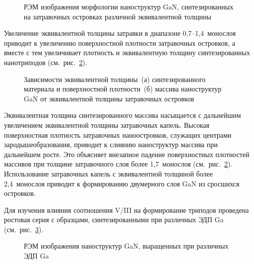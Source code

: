 \begin{figure}[ht] 
			 \caption{РЭМ
				изображения морфологии наноструктур GaN, синтезированных на затравочных
				островках различной эквивалентной толщины}\label{fig:Image_21}
			\end{figure}

Увеличение эквивалентной толщины затравки в диапазоне 0,7--1,4~монослоя
приводит к увеличению поверхностной плотности затравочных островков, а вместе с
тем увеличивает плотность и эквивалентную толщину синтезированных нанотриподов
(см.~рис.~\cref{fig:Image_22}).

\begin{figure}[ht] 
			\caption{Зависимости эквивалентной толщины~(а) синтезированного материала
				и поверхностной плотности~(б) массива наноструктур GaN от эквивалентной
				толщины затравочных островков}\label{fig:Image_22} \end{figure}

Эквивалентная толщина синтезированного массива насыщается с дальнейшим
увеличением эквивалентной толщины затравочных капель. Высокая поверхностная
плотность затравочных наноостровков, служащих центрами зародышеобразования,
приводит к слиянию наноструктур массива при дальнейшем росте. Это объясняет
внезапное падение поверхностных плотностей массивов при толщине затравочного
слоя более 1,7~монослоя (см.~рис.~\cref{fig:Image_22}). Использование
затравочных капель с эквивалентной толщиной более 2,4~монослоя приводит к
формированию двумерного слоя GaN из сросшихся островков.

Для изучения влияния соотношения V/III на формирование триподов проведена
ростовая серия с образцами, синтезированными при различных ЭДП Ga
(см.~рис.~\cref{fig:Image_23}).

\begin{figure}[ht]   \caption{РЭМ изображения наноструктур GaN,
		выращенных при различных ЭДП Ga}\label{fig:Image_23} \end{figure}

